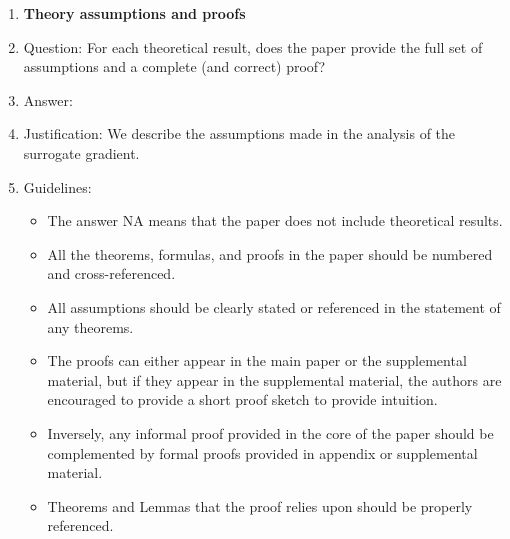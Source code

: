 \documentclass{article}
\begin{document}
\begin{enumerate}
\item {\bf Theory assumptions and proofs}
    \item[] Question: For each theoretical result, does the paper provide the full set of assumptions and a complete (and correct) proof?
    \item[] Answer: \answerYes{} %
    \item[] Justification: We describe the assumptions made in the analysis of the surrogate gradient. 
    \item[] Guidelines:
    \begin{itemize}
        \item The answer NA means that the paper does not include theoretical results. 
        \item All the theorems, formulas, and proofs in the paper should be numbered and cross-referenced.
        \item All assumptions should be clearly stated or referenced in the statement of any theorems.
        \item The proofs can either appear in the main paper or the supplemental material, but if they appear in the supplemental material, the authors are encouraged to provide a short proof sketch to provide intuition. 
        \item Inversely, any informal proof provided in the core of the paper should be complemented by formal proofs provided in appendix or supplemental material.
        \item Theorems and Lemmas that the proof relies upon should be properly referenced. 
    \end{itemize}


\end{enumerate}
\end{document}
